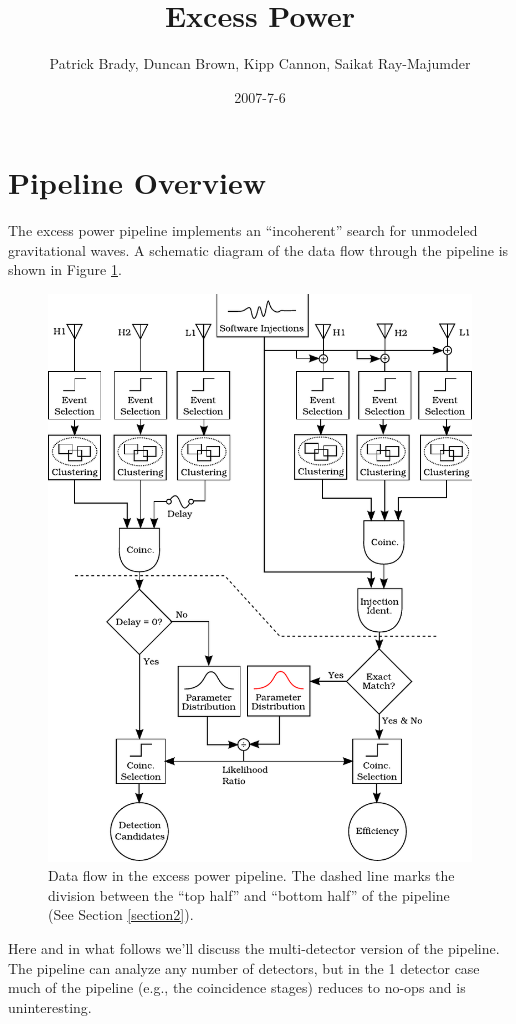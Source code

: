 \documentclass[10pt]{article}
\title{Excess Power}
\author{Patrick Brady, Duncan Brown, Kipp Cannon, Saikat Ray-Majumder}
\date{2007-7-6}
\begin{document}
\maketitle


\section{Pipeline Overview}


The excess power pipeline implements an ``incoherent'' search for unmodeled
gravitational waves.  A schematic diagram of the data flow through the
pipeline is shown in Figure \ref{fig1}.
\begin{figure}
\begin{center}\includegraphics{figures/pipeline.pdf}\end{center}
\caption{Data flow in the excess power pipeline.  The dashed line marks the
division between the ``top half'' and ``bottom half'' of the pipeline (See
Section \ref{section2}).}
\label{fig1}
\end{figure}
Here and in what follows we'll discuss the multi-detector version of the
pipeline.  The pipeline can analyze any number of detectors, but in the 1
detector case much of the pipeline (e.g., the coincidence stages) reduces
to no-ops and is uninteresting.
\end{document}
